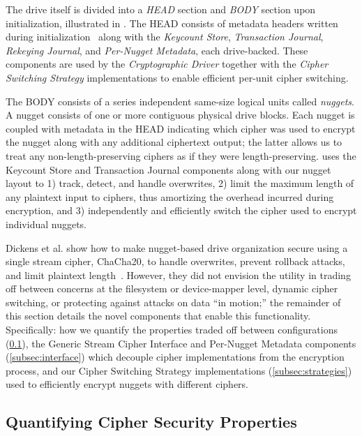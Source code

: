 The drive itself is divided into a \emph{HEAD} section and \emph{BODY} section
upon initialization, illustrated in . The HEAD consists of
metadata headers written during initialization~\cite{StrongBox} along with the
\emph{Keycount Store}, \emph{Transaction Journal}, \emph{Rekeying Journal}, and
\emph{Per-Nugget Metadata}, each drive-backed. These components are used by the
\emph{Cryptographic Driver} together with the \emph{Cipher Switching Strategy}
implementations to enable efficient per-unit cipher switching.

The BODY consists of a series independent same-size logical units called
\emph{nuggets}. A nugget consists of one or more contiguous physical drive
blocks. Each nugget is coupled with metadata in the HEAD indicating which cipher
was used to encrypt the nugget along with any additional ciphertext output; the
latter allows us to treat any non-length-preserving ciphers as if they were
length-preserving. \sys{} uses the Keycount Store and Transaction Journal
components along with our nugget layout to 1) track, detect, and handle
overwrites, 2) limit the maximum length of any plaintext input to ciphers, thus
amortizing the overhead incurred during encryption, and 3) independently and
efficiently switch the cipher used to encrypt individual nuggets.

Dickens et al. show  how to make nugget-based drive organization secure using a
single stream cipher, ChaCha20, to handle overwrites, prevent rollback attacks,
and limit plaintext length~\cite{StrongBox}. However, they did not envision the
utility in trading off between concerns at the filesystem or device-mapper
level, dynamic cipher switching, or protecting against attacks on data ``in
motion;'' the remainder of this section details the novel components that enable
this functionality. Specifically: how we quantify the properties traded off
between configurations (\cref{subsec:quantify}), the Generic Stream Cipher
Interface and Per-Nugget Metadata components (\cref{subsec:interface}) which
decouple cipher implementations from the encryption process, and our Cipher
Switching Strategy implementations (\cref{subsec:strategies}) used to
efficiently encrypt nuggets with different ciphers.

\subsection{Quantifying Cipher Security Properties} \label{subsec:quantify}

